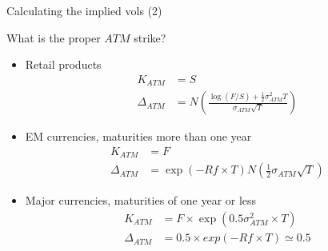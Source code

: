 \begin{frame}[fragile]{Calculating the implied vols (2)}

\begin{Shaded}
\begin{Highlighting}[]

\OperatorTok{$}\StringTok{ }\OperatorTok{+}\StringTok{ }\OperatorTok{+}\StringTok{ }\OperatorTok{*}
\OperatorTok{$}\StringTok{ }\OperatorTok{+}\StringTok{ }\OperatorTok{+}\StringTok{ }\OperatorTok{*}
\OperatorTok{$}\StringTok{ }\OperatorTok{$}\OperatorTok{-}\StringTok{ }
\OperatorTok{$}\StringTok{ }\OperatorTok{$}\OperatorTok{-}\StringTok{ }
\OperatorTok{$}\StringTok{ }

\StringTok{ }\OperatorTok{/}   
\end{Highlighting}
\end{Shaded}

\end{frame}

\begin{frame}{What is the proper \(ATM\) strike?}

\begin{itemize}
\tightlist
\item
  Retail products \[
  \begin{aligned}
  K_{ATM} &= S\\
  \Delta_{ATM} &= N \left(\frac{\log(F/S) + \frac{1}{2} \sigma_{ATM}^2 T}{\sigma_{ATM} \sqrt T} \right)
  \end{aligned}
  \]
\item
  EM currencies, maturities more than one year \[
  \begin{aligned}
  K_{ATM} &= F\\
  \Delta_{ATM} &= \exp(-Rf \times T)N(\frac{1}{2}\sigma_{ATM} \sqrt T) 
  \end{aligned}
  \]
\item
  Major currencies, maturities of one year or less \[
  \begin{aligned}
   K_{ATM} &= F \times \exp\left( 0.5 \sigma^2_{ATM}\times T \right)\\
   \Delta_{ATM} &= 0.5\times exp(-Rf \times T) \simeq 0.5 
  \end{aligned}
  \]
\end{itemize}

\end{frame}

